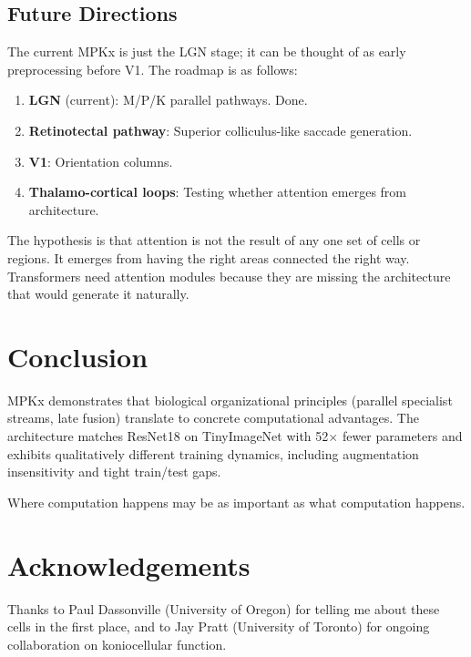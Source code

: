 \documentclass{article}
\begin{document}
\subsection{Future Directions}

The current MPKx is just the LGN stage; it can be thought of as early preprocessing before V1. The roadmap is as follows:

\begin{enumerate}
    \item \textbf{LGN} (current): M/P/K parallel pathways. Done.
    \item \textbf{Retinotectal pathway}: Superior colliculus-like saccade generation.
    \item \textbf{V1}: Orientation columns.
    \item \textbf{Thalamo-cortical loops}: Testing whether attention emerges from architecture.
\end{enumerate}

The hypothesis is that attention is not the result of any one set of cells or regions. It emerges from having the right areas connected the right way. Transformers need attention modules because they are missing the architecture that would generate it naturally.

\section{Conclusion}

MPKx demonstrates that biological organizational principles (parallel specialist streams, late fusion) translate to concrete computational advantages. The architecture matches ResNet18 on TinyImageNet with 52$\times$ fewer parameters and exhibits qualitatively different training dynamics, including augmentation insensitivity and tight train/test gaps.

Where computation happens may be as important as what computation happens.

\section*{Acknowledgements}

Thanks to Paul Dassonville (University of Oregon) for telling me about these cells in the first place, and to Jay Pratt (University of Toronto) for ongoing collaboration on koniocellular function.
\end{document}

